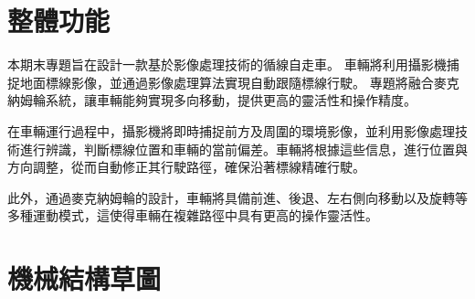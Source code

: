 \documentclass[12pt]{article}       %
\begin{document}
\newpage  %



\begin{center}
    \tableofcontents    %
\newpage 

\listoffigures      %
\listoftables       %

\end{center} 

\newpage  %
\setcounter{page}{1}  %


\section{\centering 整體功能}
\hspace{2em}本期末專題旨在設計一款基於影像處理技術的循線自走車。
車輛將利用攝影機捕捉地面標線影像，並通過影像處理算法實現自動跟隨標線行駛。
專題將融合麥克納姆輪系統，讓車輛能夠實現多向移動，提供更高的靈活性和操作精度。

在車輛運行過程中，攝影機將即時捕捉前方及周圍的環境影像，並利用影像處理技術進行辨識，判斷標線位置和車輛的當前偏差。車輛將根據這些信息，進行位置與方向調整，從而自動修正其行駛路徑，確保沿著標線精確行駛。

此外，通過麥克納姆輪的設計，車輛將具備前進、後退、左右側向移動以及旋轉等多種運動模式，這使得車輛在複雜路徑中具有更高的操作靈活性。

\section{\centering 機械結構草圖}
\end{document}
